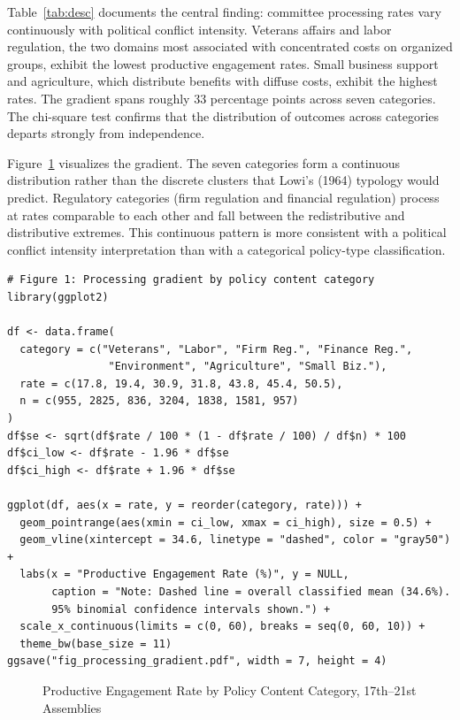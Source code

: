 \documentclass[11pt]{article}
\begin{document}
Table~\ref{tab:desc} documents the central finding: committee processing rates vary continuously with political conflict intensity. Veterans affairs and labor regulation, the two domains most associated with concentrated costs on organized groups, exhibit the lowest productive engagement rates. Small business support and agriculture, which distribute benefits with diffuse costs, exhibit the highest rates. The gradient spans roughly 33 percentage points across seven categories. The chi-square test confirms that the distribution of outcomes across categories departs strongly from independence.

Figure~\ref{fig:gradient} visualizes the gradient. The seven categories form a continuous distribution rather than the discrete clusters that Lowi's (1964) typology would predict. Regulatory categories (firm regulation and financial regulation) process at rates comparable to each other and fall between the redistributive and distributive extremes. This continuous pattern is more consistent with a political conflict intensity interpretation than with a categorical policy-type classification.

\begin{verbatim}
# Figure 1: Processing gradient by policy content category
library(ggplot2)

df <- data.frame(
  category = c("Veterans", "Labor", "Firm Reg.", "Finance Reg.",
                "Environment", "Agriculture", "Small Biz."),
  rate = c(17.8, 19.4, 30.9, 31.8, 43.8, 45.4, 50.5),
  n = c(955, 2825, 836, 3204, 1838, 1581, 957)
)
df$se <- sqrt(df$rate / 100 * (1 - df$rate / 100) / df$n) * 100
df$ci_low <- df$rate - 1.96 * df$se
df$ci_high <- df$rate + 1.96 * df$se

ggplot(df, aes(x = rate, y = reorder(category, rate))) +
  geom_pointrange(aes(xmin = ci_low, xmax = ci_high), size = 0.5) +
  geom_vline(xintercept = 34.6, linetype = "dashed", color = "gray50") +
  labs(x = "Productive Engagement Rate (%)", y = NULL,
       caption = "Note: Dashed line = overall classified mean (34.6%).
       95% binomial confidence intervals shown.") +
  scale_x_continuous(limits = c(0, 60), breaks = seq(0, 60, 10)) +
  theme_bw(base_size = 11)
ggsave("fig_processing_gradient.pdf", width = 7, height = 4)
\end{verbatim}

\begin{figure}[H]
\centering
{}
\caption{Productive Engagement Rate by Policy Content Category, 17th--21st Assemblies}
\label{fig:gradient}
\end{figure}
\end{document}
